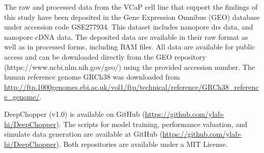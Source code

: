 \documentclass[pdflatex,sn-nature, lineno]{sn-jnl}%
\theoremstyle{thmstyleone}%
\theoremstyle{thmstyletwo}%
\theoremstyle{thmstylethree}%
\begin{document}



The raw and processed data from the VCaP cell line that support the findings of this study have been deposited in the Gene Expression Omnibus (GEO) database under accession code GSE277934. 
This dataset includes nanopore \gls{drs} data, and nanopore cDNA data.
The deposited data are available in their raw format as well as in processed forms, including BAM files.
All data are available for public access and can be downloaded directly from the GEO repository (https://www.ncbi.nlm.nih.gov/geo/) using the provided accession number.
The human reference genome GRCh38 was downloaded from \url{http://ftp.1000genomes.ebi.ac.uk/vol1/ftp/technical/reference/GRCh38\_reference\_genome/}.



DeepChopper (v1.0) is available on GitHub (\url{https://github.com/ylab-hi/DeepChopper}).
The scripts for model training, performance valuation, and simulate data generation are available at GitHub (\url{https://github.com/ylab-hi/DeepChopper}).
Both repositories are available under a MIT License.

\end{document}
